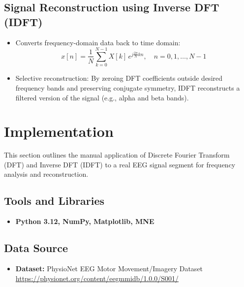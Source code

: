 \documentclass[12pt, a4paper]{article}
\begin{document}
\subsection{Signal Reconstruction using Inverse DFT (IDFT)}
\begin{itemize}
    \item Converts frequency-domain data back to time domain:
    \begin{equation}
        x[n] = \frac{1}{N} \sum_{k=0}^{N-1} X[k] \, e^{j \frac{2\pi}{N} kn}, \quad n=0,1,\dots,N-1
    \end{equation}
    \item Selective reconstruction: By zeroing DFT coefficients outside desired frequency bands and preserving conjugate symmetry, IDFT reconstructs a filtered version of the signal (e.g., alpha and beta bands).
\end{itemize}

\section{Implementation}
\label{sec:implementation}
This section outlines the manual application of Discrete Fourier Transform (DFT) and Inverse DFT (IDFT) to a real EEG signal segment for frequency analysis and reconstruction.

\subsection{Tools and Libraries}
\begin{itemize}
    \item \textbf{Python 3.12, NumPy, Matplotlib, MNE}
\end{itemize}

\subsection{Data Source}
\begin{itemize}
    \item \textbf{Dataset:} PhysioNet EEG Motor Movement/Imagery Dataset \url{https://physionet.org/content/eegmmidb/1.0.0/S001/}
\end{itemize}
\end{document}
